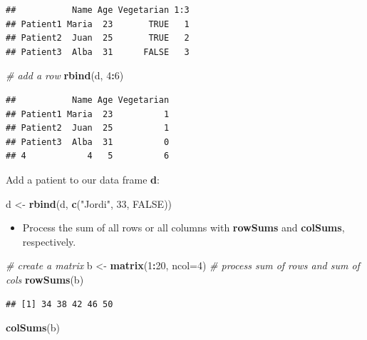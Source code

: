 \documentclass[]{book}
\newenvironment{Shaded}{\begin{snugshade}}{\end{snugshade}}
\newcommand{\CommentTok}[1]{\textcolor[rgb]{0.56,0.35,0.01}{\textit{#1}}}
\newcommand{\DataTypeTok}[1]{\textcolor[rgb]{0.13,0.29,0.53}{#1}}
\newcommand{\DecValTok}[1]{\textcolor[rgb]{0.00,0.00,0.81}{#1}}
\newcommand{\KeywordTok}[1]{\textcolor[rgb]{0.13,0.29,0.53}{\textbf{#1}}}
\newcommand{\NormalTok}[1]{#1}
\newcommand{\OperatorTok}[1]{\textcolor[rgb]{0.81,0.36,0.00}{\textbf{#1}}}
\newcommand{\OtherTok}[1]{\textcolor[rgb]{0.56,0.35,0.01}{#1}}
\newcommand{\StringTok}[1]{\textcolor[rgb]{0.31,0.60,0.02}{#1}}
\providecommand{\tightlist}{%
  \setlength{\itemsep}{0pt}\setlength{\parskip}{0pt}}
\begin{document}
\begin{verbatim}
##           Name Age Vegetarian 1:3
## Patient1 Maria  23       TRUE   1
## Patient2  Juan  25       TRUE   2
## Patient3  Alba  31      FALSE   3
\end{verbatim}

\begin{Shaded}
\begin{Highlighting}[]
\CommentTok{# add a row}
\KeywordTok{rbind}\NormalTok{(d, }\DecValTok{4}\OperatorTok{:}\DecValTok{6}\NormalTok{)}
\end{Highlighting}
\end{Shaded}

\begin{verbatim}
##           Name Age Vegetarian
## Patient1 Maria  23          1
## Patient2  Juan  25          1
## Patient3  Alba  31          0
## 4            4   5          6
\end{verbatim}

Add a patient to our data frame \textbf{d}:

\begin{Shaded}
\begin{Highlighting}[]
\NormalTok{d <-}\StringTok{ }\KeywordTok{rbind}\NormalTok{(d, }\KeywordTok{c}\NormalTok{(}\StringTok{"Jordi"}\NormalTok{, }\DecValTok{33}\NormalTok{, }\OtherTok{FALSE}\NormalTok{))}
\end{Highlighting}
\end{Shaded}

\begin{itemize}
\tightlist
\item
  Process the sum of all rows or all columns with \textbf{rowSums} and \textbf{colSums}, respectively.
\end{itemize}

\begin{Shaded}
\begin{Highlighting}[]
\CommentTok{# create a matrix}
\NormalTok{b <-}\StringTok{ }\KeywordTok{matrix}\NormalTok{(}\DecValTok{1}\OperatorTok{:}\DecValTok{20}\NormalTok{, }\DataTypeTok{ncol=}\DecValTok{4}\NormalTok{)}
\CommentTok{# process sum of rows and sum of cols}
\KeywordTok{rowSums}\NormalTok{(b)}
\end{Highlighting}
\end{Shaded}

\begin{verbatim}
## [1] 34 38 42 46 50
\end{verbatim}

\begin{Shaded}
\begin{Highlighting}[]
\KeywordTok{colSums}\NormalTok{(b)}
\end{Highlighting}
\end{Shaded}
\end{document}
